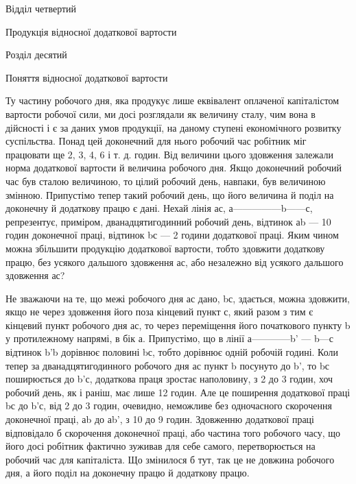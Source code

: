 Відділ четвертий

Продукція відносної додаткової вартости

Розділ десятий

Поняття відносної додаткової вартости

Ту частину робочого дня, яка продукує лише еквівалент
оплаченої капіталістом вартости робочої сили, ми досі розглядали
як величину сталу, чим вона в дійсності і є за даних умов продукції,
на даному ступені економічного розвитку суспільства. Понад
цей доконечний для нього робочий час робітник міг працювати
ще 2, 3, 4, 6 і т. д. годин. Від величини цього здовження залежали
норма додаткової вартости й величина робочого дня. Якщо
доконечний робочий час був сталою величиною, то цілий робочий
день, навпаки, був величиною змінною. Припустімо тепер такий
робочий день, що його величина й поділ на доконечну й додаткову
працю є дані. Нехай лінія ас, а—————b——с, репрезентує,
приміром, дванадцятигодинний робочий день, відтинок
аb — 10 годин доконечної праці, відтинок bс — 2 години додаткової
праці. Яким чином можна збільшити продукцію додаткової
вартости, тобто здовжити додаткову працю, без усякого дальшого
здовження ас, або незалежно від усякого дальшого здовження ас?

Не зважаючи на те, що межі робочого дня ас дано, bс, здається,
можна здовжити, якщо не через здовження його поза кінцевий
пункт с, який разом з тим є кінцевий пункт робочого дня ас, то
через переміщення його початкового пункту b у протилежному напрямі,
в бік а. Припустімо, що в лінії а————b' — b—с
відтинок b'b дорівнює половині bс, тобто дорівнює одній робочій
годині. Коли тепер за дванадцятигодинного робочого дня
ас пункт b посунуто до b', то bс поширюється до b'с, додаткова
праця зростає наполовину, з 2 до 3 годин, хоч робочий день,
як і раніш, має лише 12 годин. Але це поширення додаткової
праці bс до b'с, від 2 до 3 годин, очевидно, неможливе без одночасного
скорочення доконечної праці, аb до аb', з 10 до 9 годин.
Здовженню додаткової праці відповідало б скорочення доконечної
праці, або частина того робочого часу, що його досі
робітник фактично зуживав для себе самого, перетворюється на
робочий час для капіталіста. Що змінилося б тут, так це не довжина
робочого дня, а його поділ на доконечну працю й додаткову
працю.

